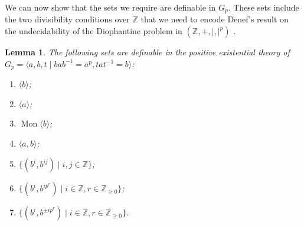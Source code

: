 \documentclass[11pt]{amsart}
\newtheorem{lem}[theorem]{Lemma}
\theoremstyle{definition}
\numberwithin{theorem}{section}
\DeclareMathOperator{\Mon}{Mon}
\newcommand{\Z}{\mathbb{Z}}
\begin{document}
We can now show that the sets we require are definable in \(G_p\). These sets
include the two divisibility conditions over \(\Z\) that we need to encode
Denef's result on the undecidability of the Diophantine problem in
\((\Z, +, |, |^p)\) \cite{Denef}.

\begin{lem}
	\label{defable}
	The following sets are definable in the positive existential theory of
	\(G_p = \langle a, b, t \mid bab^{-1} = a^p, tat^{-1} = b\rangle\): 
	\begin{enumerate}
			\item \(\langle b \rangle\);
					\label{item:b-defable}
			\item \(\langle a \rangle\);
					\label{item:a-defable}
			\item \(\Mon \langle b \rangle\);
					\label{item:mon-b-defable}
			\item \(\langle a, b \rangle\);
					\label{item:ab-defable}
			\item \(\{(b^i, b^{ij}) \mid i, j \in \Z\}\);
					\label{item:b-div-defable}
			\item \(\{(b^i, b^{i p^r}) \mid i \in \Z, r \in \Z_{\geq 0}\}\);
					\label{item:b-divp-pre-defable}
			\item \(\{(b^i, b^{\pm i p^r}) \mid i \in \Z, r \in \Z_{\geq 0}\}\).
					\label{item:b-divp-defable}
	\end{enumerate}
\end{lem}
\end{document}
